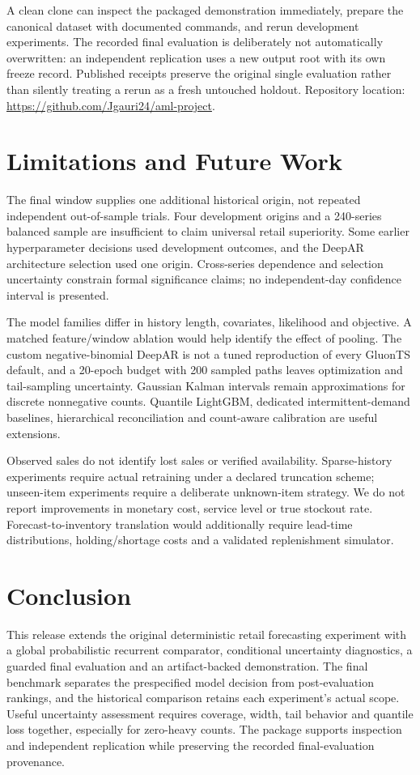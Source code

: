 \documentclass[conference]{IEEEtran}
\begin{document}
A clean clone can inspect the packaged demonstration immediately, prepare the canonical dataset with documented commands, and rerun development experiments. The recorded final evaluation is deliberately not automatically overwritten: an independent replication uses a new output root with its own freeze record. Published receipts preserve the original single evaluation rather than silently treating a rerun as a fresh untouched holdout. Repository location: \url{https://github.com/Jgauri24/aml-project}.

\section{Limitations and Future Work}
The final window supplies one additional historical origin, not repeated independent out-of-sample trials. Four development origins and a 240-series balanced sample are insufficient to claim universal retail superiority. Some earlier hyperparameter decisions used development outcomes, and the DeepAR architecture selection used one origin. Cross-series dependence and selection uncertainty constrain formal significance claims; no independent-day confidence interval is presented.

The model families differ in history length, covariates, likelihood and objective. A matched feature/window ablation would help identify the effect of pooling. The custom negative-binomial DeepAR is not a tuned reproduction of every GluonTS default, and a 20-epoch budget with 200 sampled paths leaves optimization and tail-sampling uncertainty. Gaussian Kalman intervals remain approximations for discrete nonnegative counts. Quantile LightGBM, dedicated intermittent-demand baselines, hierarchical reconciliation and count-aware calibration are useful extensions.

Observed sales do not identify lost sales or verified availability. Sparse-history experiments require actual retraining under a declared truncation scheme; unseen-item experiments require a deliberate unknown-item strategy. We do not report improvements in monetary cost, service level or true stockout rate. Forecast-to-inventory translation would additionally require lead-time distributions, holding/shortage costs and a validated replenishment simulator.

\section{Conclusion}
This release extends the original deterministic retail forecasting experiment with a global probabilistic recurrent comparator, conditional uncertainty diagnostics, a guarded final evaluation and an artifact-backed demonstration. The final benchmark separates the prespecified model decision from post-evaluation rankings, and the historical comparison retains each experiment's actual scope. Useful uncertainty assessment requires coverage, width, tail behavior and quantile loss together, especially for zero-heavy counts. The package supports inspection and independent replication while preserving the recorded final-evaluation provenance.
\end{document}
